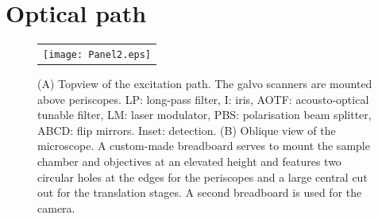 \documentclass[12pt]{spieman}  %
\begin{document}
	\section{Optical path}

		
		\begin{figure}
   \begin{center}
   \begin{tabular}{c}
   \texttt{[image: Panel2.eps]}
   \end{tabular}
   \end{center}
   \caption{\label{fig:excitation} (A) Topview of the excitation path. The galvo scanners are mounted above periscopes. LP: long-pass filter, I: iris, AOTF: acousto-optical tunable filter, LM: laser modulator, PBS: polarisation beam splitter, ABCD: flip mirrors. Inset: detection. (B) Oblique view of the microscope. A custom-made breadboard serves to mount the sample chamber and objectives at an elevated height and features two circular holes at the edges for the periscopes and a large central cut out for the translation stages. A second breadboard is used for the camera.} 
   \end{figure}
\end{document}
